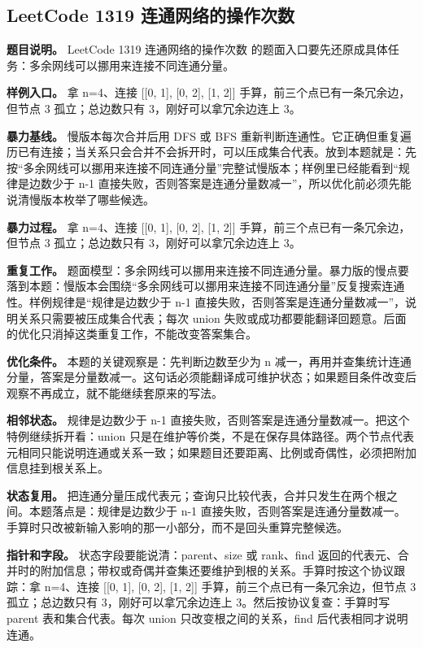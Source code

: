 \subsection{LeetCode 1319 连通网络的操作次数}

\textbf{题目说明。} LeetCode 1319 连通网络的操作次数 的题面入口要先还原成具体任务：多余网线可以挪用来连接不同连通分量。

\textbf{样例入口。} 拿 n=4、连接 [[0, 1], [0, 2], [1, 2]] 手算，前三个点已有一条冗余边，但节点 3 孤立；总边数只有 3，刚好可以拿冗余边连上 3。

\textbf{暴力基线。} 慢版本每次合并后用 DFS 或 BFS 重新判断连通性。它正确但重复遍历已有连接；当关系只会合并不会拆开时，可以压成集合代表。放到本题就是：先按“多余网线可以挪用来连接不同连通分量”完整试慢版本；样例里已经能看到“规律是边数少于 n-1 直接失败，否则答案是连通分量数减一”，所以优化前必须先能说清慢版本枚举了哪些候选。

\textbf{暴力过程。} 拿 n=4、连接 [[0, 1], [0, 2], [1, 2]] 手算，前三个点已有一条冗余边，但节点 3 孤立；总边数只有 3，刚好可以拿冗余边连上 3。

\textbf{重复工作。} 题面模型：多余网线可以挪用来连接不同连通分量。暴力版的慢点要落到本题：慢版本会围绕“多余网线可以挪用来连接不同连通分量”反复搜索连通性。样例规律是“规律是边数少于 n-1 直接失败，否则答案是连通分量数减一”，说明关系只需要被压成集合代表；每次 union 失败或成功都要能翻译回题意。后面的优化只消掉这类重复工作，不能改变答案集合。

\textbf{优化条件。} 本题的关键观察是：先判断边数至少为 n 减一，再用并查集统计连通分量，答案是分量数减一。这句话必须能翻译成可维护状态；如果题目条件改变后观察不再成立，就不能继续套原来的写法。

\textbf{相邻状态。} 规律是边数少于 n-1 直接失败，否则答案是连通分量数减一。把这个特例继续拆开看：union 只是在维护等价类，不是在保存具体路径。两个节点代表元相同只能说明连通或关系一致；如果题目还要距离、比例或奇偶性，必须把附加信息挂到根关系上。

\textbf{状态复用。} 把连通分量压成代表元；查询只比较代表，合并只发生在两个根之间。本题落点是：规律是边数少于 n-1 直接失败，否则答案是连通分量数减一。手算时只改被新输入影响的那一小部分，而不是回头重算完整候选。

\textbf{指针和字段。} 状态字段要能说清：parent、size 或 rank、find 返回的代表元、合并时的附加信息；带权或奇偶并查集还要维护到根的关系。手算时按这个协议跟踪：拿 n=4、连接 [[0, 1], [0, 2], [1, 2]] 手算，前三个点已有一条冗余边，但节点 3 孤立；总边数只有 3，刚好可以拿冗余边连上 3。然后按协议复查：手算时写 parent 表和集合代表。每次 union 只改变根之间的关系，find 后代表相同才说明连通。

